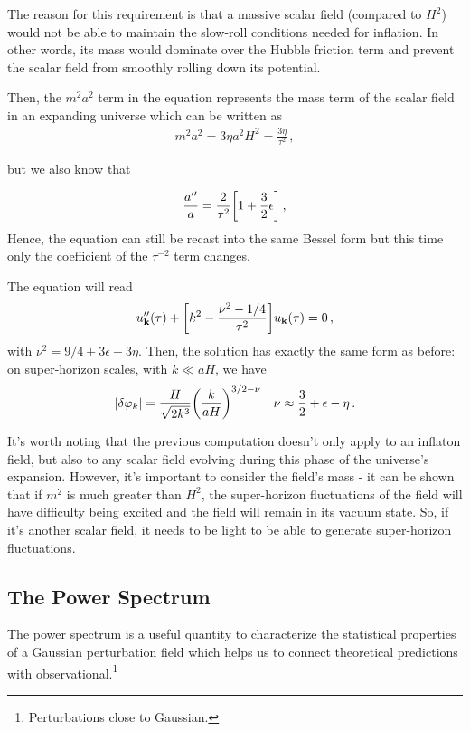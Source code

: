 The reason for this requirement is that a massive scalar field (compared to $H^2$) would not be able to maintain the slow-roll conditions needed for inflation. In other words, its mass would dominate over the Hubble friction term and prevent the scalar field from smoothly rolling down its potential.

 Then, the \(m^2 a^2\) term in the equation represents the mass term of the scalar field in an expanding universe which can be written as
\begin{align}
    m^2 a^2 = 3 \eta a^2 H^2 = \frac{3 \eta}{\tau^2}\label{1.2.104}
    \,,
\end{align}

but we also know that 

\begin{align}
    \frac{a''}{a} = \frac{2}{\tau^2 } \qty[ 1 + \frac{3}{2} \epsilon ]
    \,, \label{1.2.105}
\end{align}
%
Hence, the equation can still be recast into the same Bessel form but this time only the coefficient of the \(\tau^{-2}\) term changes.

The equation will read 
%
\begin{align}
    u''_{\mathbf{k}} (\tau ) + \qty[ k^2 - \frac{\nu^2 - 1/4}{\tau^2}]  u_{\mathbf{k}}(\tau ) = 0
    \,,\label{1.2.106}
\end{align}
%
with \(\nu^2 = 9/4 + 3 \epsilon - 3 \eta\). 
Then, the solution has exactly the same form as before:\\
on super-horizon scales, with \(k \ll aH\), we have
%
\begin{align}
    \abs{ \delta \varphi _k} = \frac{H}{\sqrt{2 k^3}} \qty( \frac{k}{aH})^{3/2 - \nu }
    &&
    \nu \approx \frac{3}{2} + \epsilon - \eta
    \,.\label{1.2.107}
\end{align}

It's worth noting that the previous computation doesn't only apply to an inflaton field, but also to any scalar field evolving during this phase of the universe's expansion. However, it's important to consider the field's mass - it can be shown that if $m^2$ is much greater than $H^2$, the super-horizon fluctuations of the field will have difficulty being excited and the field will remain in its vacuum state. So, if it's another scalar field, it needs to be light to be able to generate super-horizon fluctuations.








\subsection{The Power Spectrum} \label{section 1.7.5}
The power spectrum is a useful quantity to characterize the statistical properties of a Gaussian perturbation field which helps us to connect theoretical predictions with observational.\footnote{Perturbations close to Gaussian.}

